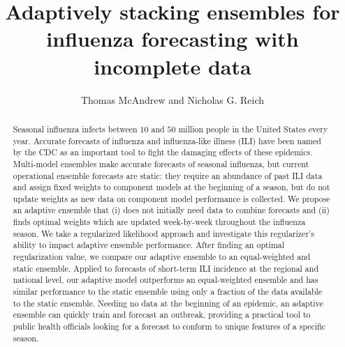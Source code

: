 \documentclass[sagev,times,Review,10pt]{sagej}
\begin{document}

\title{Adaptively stacking ensembles for influenza forecasting with incomplete data}

\author{Thomas McAndrew and Nicholas G. Reich}




\begin{abstract}
Seasonal influenza infects between $10$ and $50$ million people in the United States every year. 
Accurate forecasts of influenza and influenza-like illness (ILI) have been named by the CDC as an important tool to fight the damaging effects of these epidemics.
Multi-model ensembles make accurate forecasts of seasonal influenza, but current operational ensemble forecasts are static: they require an abundance of past ILI data and assign fixed weights to component models at the beginning of a season, but do not update weights as new data on component model performance is collected. 
We propose an adaptive ensemble that (i) does not initially need data to combine forecasts and (ii) finds optimal weights which are updated week-by-week throughout the influenza season.
We take a regularized likelihood approach and investigate this regularizer's ability to impact adaptive ensemble performance.
After finding an optimal regularization value, we compare our adaptive ensemble to an equal-weighted and static ensemble.
Applied to forecasts of short-term ILI incidence at the regional and national level, our adaptive model outperforms an equal-weighted ensemble and has similar performance to the static ensemble using only a fraction of the data available to the static ensemble.
Needing no data at the beginning of an epidemic, an adaptive ensemble can quickly train and forecast an outbreak, providing a practical tool to public health officials looking for a forecast to conform to unique features of a specific season.
\end{abstract}
\end{document}
